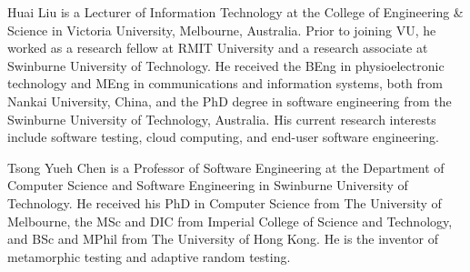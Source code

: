 \documentclass[10pt,journal,compsoc]{IEEEtran}
\begin{document}
\begin{IEEEbiography}{Huai Liu} is a Lecturer of Information Technology at the College of Engineering \& Science in Victoria University, Melbourne, Australia. Prior to joining VU, he worked as a research fellow at RMIT University and a research associate at Swinburne University of Technology. He received the BEng in physioelectronic technology and MEng in communications and information systems, both from Nankai University, China, and the PhD degree in software engineering from the Swinburne University of Technology, Australia. His current research interests include software testing, cloud computing, and end-user software engineering.
\end{IEEEbiography}
\begin{IEEEbiography}{Tsong Yueh Chen} is a Professor of Software Engineering at the Department of Computer Science and Software Engineering in Swinburne University of Technology. He received his PhD in Computer Science from The University of Melbourne, the MSc and DIC from Imperial College of Science and Technology, and BSc and MPhil from The University of Hong Kong. He is the inventor of metamorphic testing and adaptive random testing.
\end{IEEEbiography}
\end{document}
